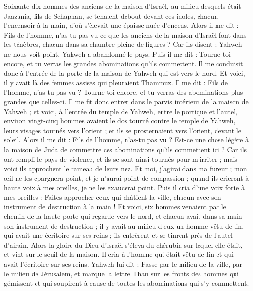 \begin{multicols}{2}
Soixante-dix hommes des anciens de la maison d'Israël, au milieu desquels était Jaazania, fils de Schaphan, se tenaient debout devant ces idoles, chacun l’encensoir à la main, d'où s’élevait une épaisse nuée d’encens.
Alors il me dit : Fils de l’homme, n'as-tu pas vu ce que les anciens de la maison d'Israël font dans les ténèbres, chacun dans sa chambre pleine de figures ? Car ils disent : Yahweh ne nous voit point, Yahweh a abandonné le pays.
Puis il me dit : Tourne-toi encore, et tu verras les grandes abominations qu’ils commettent.
Il me conduisit donc à l'entrée de la porte de la maison de Yahweh qui est vers le nord. Et voici, il y avait là des femmes assises qui pleuraient Thammuz.
Il me dit : Fils de l’homme, n'as-tu pas vu ? Tourne-toi encore, et tu verras des abominations plus grandes que celles-ci.
Il me fit donc entrer dans le parvis intérieur de la maison de Yahweh ; et voici, à l'entrée du temple de Yahweh, entre le portique et l'autel, environ vingt-cinq hommes avaient le dos tourné contre le temple de Yahweh, leurs visages tournés vers l'orient ; et ils se prosternaient vers l'orient, devant le soleil.
Alors il me dit : Fils de l’homme, n'as-tu pas vu ? Est-ce une chose légère à la maison de Juda de commettre ces abominations qu'ils commettent ici ? Car ils ont rempli le pays de violence, et ils se sont ainsi tournés pour m'irriter ; mais voici ils approchent le rameau de leurs nez.
Et moi, j'agirai dans ma fureur ; mon œil ne les épargnera point, et je n'aurai point de compassion ; quand ils crieront à haute voix à mes oreilles, je ne les exaucerai point.
\VerseOne{}Puis il cria d'une voix forte à mes oreilles : Faites approcher ceux qui châtient la ville, chacun avec son instrument de destruction à la main !
Et voici, six hommes venaient par le chemin de la haute porte qui regarde vers le nord, et chacun avait dans sa main son instrument de destruction ; il y avait au milieu d'eux un homme vêtu de lin, qui avait une écritoire sur ses reins ; ils entrèrent et se tinrent près de l'autel d'airain.
Alors la gloire du Dieu d'Israël s'éleva du chérubin sur lequel elle était, et vint sur le seuil de la maison. Il cria à l'homme qui était vêtu de lin et qui avait l’écritoire sur ses reins.
Yahweh lui dit : Passe par le milieu de la ville, par le milieu de Jérusalem, et marque la lettre Thau sur les fronts des hommes qui gémissent et qui soupirent à cause de toutes les abominations qui s’y commettent.

\end{multicols}
